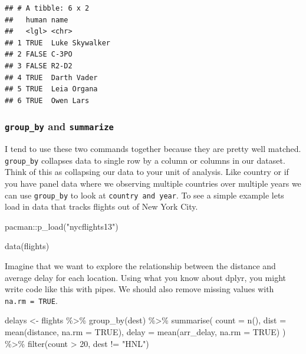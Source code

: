 \documentclass[]{tufte-handout}
\newenvironment{Shaded}{}{}
\newcommand{\AttributeTok}[1]{\textcolor[rgb]{0.49,0.56,0.16}{#1}}
\newcommand{\ConstantTok}[1]{\textcolor[rgb]{0.53,0.00,0.00}{#1}}
\newcommand{\DecValTok}[1]{\textcolor[rgb]{0.25,0.63,0.44}{#1}}
\newcommand{\FunctionTok}[1]{\textcolor[rgb]{0.02,0.16,0.49}{#1}}
\newcommand{\NormalTok}[1]{#1}
\newcommand{\OtherTok}[1]{\textcolor[rgb]{0.00,0.44,0.13}{#1}}
\newcommand{\SpecialCharTok}[1]{\textcolor[rgb]{0.25,0.44,0.63}{#1}}
\newcommand{\StringTok}[1]{\textcolor[rgb]{0.25,0.44,0.63}{#1}}
\begin{document}
\begin{verbatim}
## # A tibble: 6 x 2
##   human name          
##   <lgl> <chr>         
## 1 TRUE  Luke Skywalker
## 2 FALSE C-3PO         
## 3 FALSE R2-D2         
## 4 TRUE  Darth Vader   
## 5 TRUE  Leia Organa   
## 6 TRUE  Owen Lars
\end{verbatim}

\hypertarget{group_by-and-summarize}{%
\subsubsection{\texorpdfstring{\texttt{group\_by} and
\texttt{summarize}}{group\_by and summarize}}\label{group_by-and-summarize}}

I tend to use these two commands together because they are pretty well
matched. \texttt{group\_by} collapses data to single row by a column or
columns in our dataset. Think of this as collapsing our data to your
unit of analysis. Like country or if you have panel data where we
observing multiple countries over multiple years we can use
\texttt{group\_by} to look at \texttt{country\ and\ year}. To see a
simple example lets load in data that tracks flights out of New York
City.

\begin{Shaded}
\begin{Highlighting}[]
\NormalTok{pacman}\SpecialCharTok{::}\FunctionTok{p\_load}\NormalTok{(}\StringTok{"nycflights13"}\NormalTok{)}

\FunctionTok{data}\NormalTok{(flights)}
\end{Highlighting}
\end{Shaded}

Imagine that we want to explore the relationship between the distance
and average delay for each location. Using what you know about dplyr,
you might write code like this with pipes. We should also remove missing
values with \texttt{na.rm\ =\ TRUE}.

\begin{Shaded}
\begin{Highlighting}[]
\NormalTok{delays }\OtherTok{\textless{}{-}}\NormalTok{ flights }\SpecialCharTok{\%\textgreater{}\%}
  \FunctionTok{group\_by}\NormalTok{(dest) }\SpecialCharTok{\%\textgreater{}\%}
  \FunctionTok{summarise}\NormalTok{(}
    \AttributeTok{count =} \FunctionTok{n}\NormalTok{(),}
    \AttributeTok{dist =} \FunctionTok{mean}\NormalTok{(distance, }\AttributeTok{na.rm =} \ConstantTok{TRUE}\NormalTok{),}
    \AttributeTok{delay =} \FunctionTok{mean}\NormalTok{(arr\_delay, }\AttributeTok{na.rm =} \ConstantTok{TRUE}\NormalTok{)}
\NormalTok{  ) }\SpecialCharTok{\%\textgreater{}\%}
  \FunctionTok{filter}\NormalTok{(count }\SpecialCharTok{\textgreater{}} \DecValTok{20}\NormalTok{, dest }\SpecialCharTok{!=} \StringTok{"HNL"}\NormalTok{)}
\end{Highlighting}
\end{Shaded}
\end{document}

